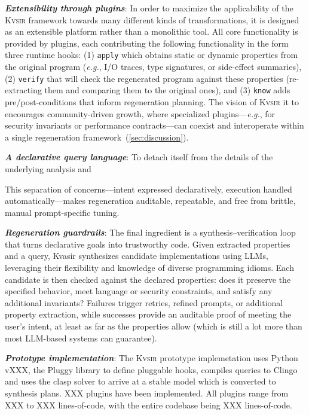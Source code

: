 \documentclass[sigplan,review,anonymous,10pt]{acmart}
\def\eg{{\em e.g.}, }
\newcommand{\sys}{{\scshape Kv{\textalpha}sir}\xspace}
\newcommand{\heading}[1]{\vspace{2pt}\noindent\textbf{\emph{#1}}:\enspace}
\newcommand{\ttt}[1]{\texttt{#1}\xspace}
\begin{document}

\heading{Extensibility through plugins}
In order to maximize the applicability of the \sys framework 
towards many different kinds of transformations,
it is designed as an extensible platform rather than a monolithic tool.
All core functionality is provided by plugins, each contributing
the following functionality in the form three runtime hooks:
(1) \ttt{apply} which obtains static or dynamic properties from the original program (\eg
I/O traces, type signatures, or side-effect summaries),
(2) \ttt{verify} that will check the regenerated program against these properties (re-extracting them and comparing them to the original ones),
and
(3) \ttt{know} adds pre/post-conditions that inform regeneration planning.
The vision of \sys it to encourages community-driven growth, where specialized plugins---\eg for
security invariants or performance contracts---can coexist and interoperate
within a single regeneration framework~(\cref{sec:discussion}).

\heading{A declarative query language}
To detach itself from the details of the underlying analysis and 

This separation of concerns---intent expressed declaratively, execution handled
automatically---makes regeneration auditable, repeatable, and free from brittle,
manual prompt-specific tuning.

\heading{Regeneration guardrails}
The final ingredient is a synthesis–verification loop that turns declarative goals into trustworthy code.
Given extracted properties and a query, Kvasir synthesizes candidate implementations using LLMs, leveraging their flexibility and knowledge of diverse programming idioms.
Each candidate is then checked against the declared properties: does it preserve the specified behavior, meet language or security constraints, and satisfy any additional invariants?
Failures trigger retries, refined prompts, or additional property extraction,
while successes provide an auditable proof of meeting the user’s intent,
at least as far as the properties allow (which is still a lot more than most LLM-based systems can guarantee).

\heading{Prototype implementation}
The \sys prototype implemetation uses Python vXXX,
the Pluggy library to define pluggable hooks, compiles queries to Clingo and uses the clasp
solver to arrive at a stable model which is converted to synthesis plans. 
XXX plugins have been implemented. All plugins range from XXX to XXX lines-of-code,
with the entire codebase being XXX lines-of-code.
\end{document}
